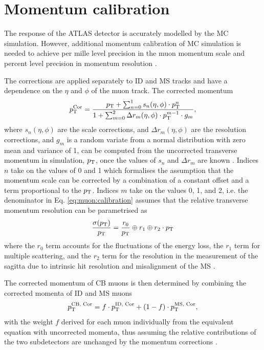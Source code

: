 \section{Momentum calibration}
\label{sec:muons:calibration}

The response of the ATLAS detector is accurately modelled by the
MC simulation. However, additional momentum calibration of MC simulation
is needed to achieve per mille level precision in the muon momentum scale
and percent level precision in momentum resolution \cite{Aad:2016jkr}.

The corrections are applied separately to ID and MS tracks and 
have a dependence on the $\eta$ and $\phi$ of the muon track. The
corrected momentum
\begin{equation}
p_{\text{T}}^\text{Cor} = \frac{p_{\text{T}} + \sum_{n=0}^1 s_n(\eta, \phi) \cdot p_{\text{T}}^n}
{1 + \sum_{m=0}^2 \Delta r_m (\eta, \phi) \cdot p_{\text{T}}^{m-1} \cdot g_m},
\label{eq:muon:calibration}
\end{equation}
where $s_n(\eta, \phi)$ are the scale corrections, and
$\Delta r_m (\eta, \phi)$ are the resolution corrections,
and $g_m$ is a random variate from a normal distribution with zero mean
and variance of 1, 
can be computed from the uncorrected transverse momentum in simulation,
$p_{\text{T}}$, once the values of $s_n$ and $\Delta r_m$ are known \cite{Aad:2016jkr}.
Indices $n$ take on the values of 0 and 1 which formalises the assumption
that the momentum scale can be corrected by a combination of a constant offset
and a term proportional to the $p_{\text{T}}$.
Indices $m$ take on the values 0, 1, and 2, i.e. 
the denominator in Eq. \ref{eq:muon:calibration} assumes that the relative
transverse momentum resolution can be parametrised as
\begin{equation}
\frac{\sigma(p_{\text{T}})}{p_{\text{T}}} = \frac{r_0}{p_{\text{T}}} \oplus r_1 \oplus r_2 \cdot p_{\text{T}}
\end{equation}
where the $r_0$ term accounts for the fluctuations of the energy loss, the
$r_1$ term for multiple scattering, and the $r_2$ term for the
resolution in the measurement of the sagitta due to intrinsic hit resolution
and misalignment of the MS \cite{Aad:2016jkr}.

The corrected momentum of CB muons is then determined by combining the
corrected momenta of ID and MS muons
\begin{equation}
p_{\text{T}}^\text{CB, Cor} = f \cdot p_{\text{T}}^\text{ID, Cor} + (1-f) \cdot p_{\text{T}}^\text{MS, Cor},
\end{equation}
with the weight $f$ derived for each muon individually from the equivalent
equation with uncorrected momenta, thus assuming the relative contributions
of the two subdetectors are unchanged by the momentum corrections \cite{Aad:2016jkr}.

